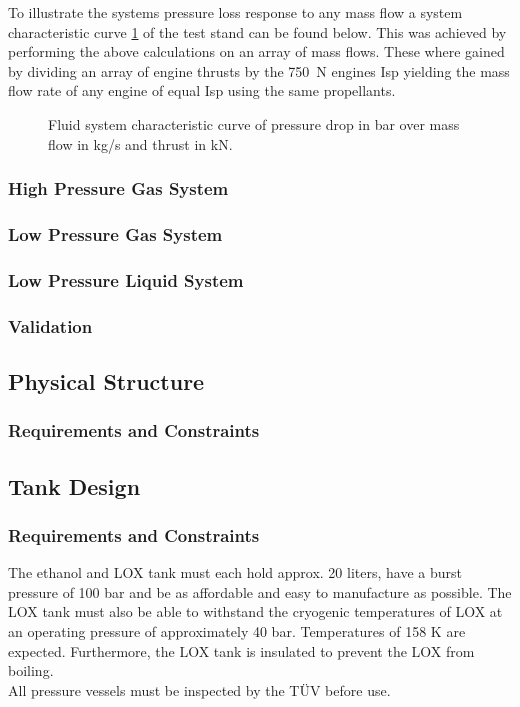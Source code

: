                 To illustrate the systems pressure loss response to any mass flow a system characteristic curve \ref{fig:system_characteristic curve} of the test stand can be found below. This was achieved by performing the above calculations on an array of mass flows. These where gained by dividing an array of engine thrusts by the \qty{750}{N} engines Isp yielding the mass flow rate of any engine of equal Isp using the same propellants.
                \begin{figure}[h]
                    \centering
                    
                    \caption{Fluid system characteristic curve of pressure drop in \unit{bar} over mass flow in \unit{kg/s} and thrust in \unit{kN}.}
                    \label{fig:system_characteristic curve}
                \end{figure}
                
        \subsubsection{High Pressure Gas System}
        \subsubsection{Low Pressure Gas System}
 
        \subsubsection{Low Pressure Liquid System}
        \subsubsection{Validation}


    \subsection{Physical Structure}
        \subsubsection{Requirements and Constraints}

    \subsection{Tank Design}
        \subsubsection{Requirements and Constraints}
The ethanol and LOX tank must each hold approx. 20 liters, have a burst pressure of 100 bar and be as affordable and easy to manufacture as possible. The LOX tank must also be able to withstand the cryogenic temperatures of LOX at an operating pressure of approximately 40 bar. Temperatures of 158 K are expected. Furthermore, the LOX tank is insulated to prevent the LOX from boiling.\\
All pressure vessels must be inspected by the TÜV before use. 
